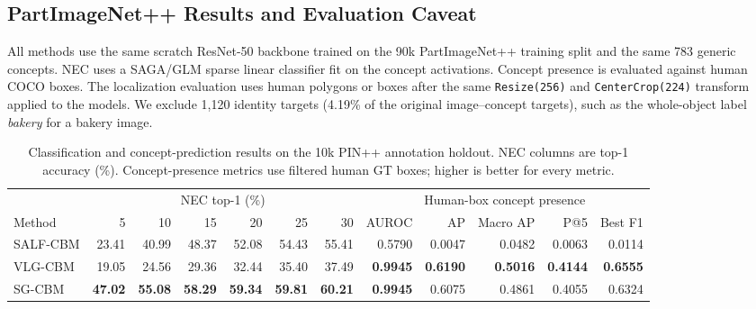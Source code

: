 
\subsection{PartImageNet++ Results and Evaluation Caveat}

All methods use the same scratch ResNet-50 backbone trained on the 90k
PartImageNet++ training split and the same 783 generic concepts.  NEC uses a
SAGA/GLM sparse linear classifier fit on the concept activations.  Concept
presence is evaluated against human COCO boxes.  The localization evaluation
uses human polygons or boxes after the same \texttt{Resize(256)} and
\texttt{CenterCrop(224)} transform applied to the models.  We exclude 1,120
identity targets (4.19\% of the original image--concept targets), such as the
whole-object label \emph{bakery} for a bakery image.

\begin{table}[t]
\centering
\caption{Classification and concept-prediction results on the 10k PIN++
annotation holdout.  NEC columns are top-1 accuracy (\%).  Concept-presence
metrics use filtered human GT boxes; higher is better for every metric.}
\label{tab:pinpp-classification-concepts}
\small
\setlength{\tabcolsep}{5pt}
\begin{tabular}{lrrrrrr|rrrrr}
\toprule
& \multicolumn{6}{c|}{NEC top-1 (\%)}
& \multicolumn{5}{c}{Human-box concept presence} \\
\cmidrule(lr){2-7}\cmidrule(l){8-12}
Method & 5 & 10 & 15 & 20 & 25 & 30
& AUROC & AP & Macro AP & P@5 & Best F1 \\
\midrule
SALF-CBM & 23.41 & 40.99 & 48.37 & 52.08 & 54.43 & 55.41
& 0.5790 & 0.0047 & 0.0482 & 0.0063 & 0.0114 \\
VLG-CBM & 19.05 & 24.56 & 29.36 & 32.44 & 35.40 & 37.49
& \textbf{0.9945} & \textbf{0.6190} & \textbf{0.5016} & \textbf{0.4144} & \textbf{0.6555} \\
SG-CBM & \textbf{47.02} & \textbf{55.08} & \textbf{58.29} & \textbf{59.34} & \textbf{59.81} & \textbf{60.21}
& \textbf{0.9945} & 0.6075 & 0.4861 & 0.4055 & 0.6324 \\
\bottomrule
\end{tabular}
\end{table}

